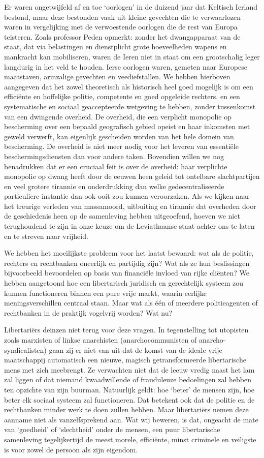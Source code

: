 \documentclass[
  a5paper,
  smalldemyvopaper,10pt,twoside,onecolumn,openright,extrafontsizes,hidelinks]{memoir}
\begin{document}
Er waren ongetwijfeld af en toe `oorlogen' in de duizend jaar dat
Keltisch Ierland bestond, maar deze bestonden vaak uit kleine gevechten
die te verwaarlozen waren in vergelijking met de verwoestende oorlogen
die de rest van Europa teisteren. Zoals professor Peden opmerkt: zonder
het dwangapparaat van de staat, dat via belastingen en dienstplicht
grote hoeveelheden wapens en mankracht kan mobiliseren, waren de Ieren
niet in staat om een grootschalig leger langdurig in het veld te houden.
Ierse oorlogen waren, gemeten naar Europese maatstaven, armzalige
gevechten en veediefstallen. We hebben hierboven aangegeven dat het
zowel theoretisch als historisch heel goed mogelijk is om een efficiënte
en hoffelijke politie, competente en goed opgeleide rechters, en een
systematische en sociaal geaccepteerde wetgeving te hebben, zonder
tussenkomst van een dwingende overheid. De overheid, die een verplicht
monopolie op bescherming over een bepaald geografisch gebied opeist en
haar inkomsten met geweld verwerft, kan eigenlijk gescheiden worden van
het hele domein van bescherming. De overheid is niet meer nodig voor het
leveren van essentiële beschermingsdiensten dan voor andere taken.
Bovendien willen we nog benadrukken dat er een cruciaal feit is over de
overheid: haar verplichte monopolie op dwang heeft door de eeuwen heen
geleid tot ontelbare slachtpartijen en veel grotere tirannie en
onderdrukking dan welke gedecentraliseerde particuliere instantie dan
ook ooit zou kunnen veroorzaken. Als we kijken naar het treurige
verleden van massamoord, uitbuiting en tirannie dat overheden door de
geschiedenis heen op de samenleving hebben uitgeoefend, hoeven we niet
terughoudend te zijn in onze keuze om de Leviathaanse staat achter ons
te laten en te streven naar vrijheid.

We hebben het moeilijkste probleem voor het laatst bewaard: wat als de
politie, rechters en rechtbanken oneerlijk en partijdig zijn? Wat als ze
hun beslissingen bijvoorbeeld bevoordelen op basis van financiële
invloed van rijke cliënten? We hebben aangetoond hoe een libertarisch
juridisch en gerechtelijk systeem zou kunnen functioneren binnen een
pure vrije markt, waarin eerlijke meningsverschillen centraal staan.
Maar wat als één of meerdere politieagenten of rechtbanken in de
praktijk vogelvrij worden? Wat nu?

Libertariërs deinzen niet terug voor deze vragen. In tegenstelling tot
utopisten zoals marxisten of linkse anarchisten (anarchocommunisten of
anarcho-syndicalisten) gaan zij er niet van uit dat de komst van de
ideale vrije maatschappij automatisch een nieuwe, magisch
getransformeerde libertarische mens met zich meebrengt. Ze verwachten
niet dat de leeuw vredig naast het lam zal liggen of dat niemand
kwaadwillende of frauduleuze bedoelingen zal hebben ten opzichte van
zijn buurman. Natuurlijk geldt: hoe `beter' de mensen zijn, hoe beter
elk sociaal systeem zal functioneren. Dat betekent ook dat de politie en
de rechtbanken minder werk te doen zullen hebben. Maar libertariërs
nemen deze aanname niet als vanzelfsprekend aan. Wat wij beweren, is
dat, ongeacht de mate van `goedheid' of `slechtheid' onder de mensen,
een puur libertarische samenleving tegelijkertijd de meest morele,
efficiënte, minst criminele en veiligste is voor zowel de persoon als
zijn eigendom.
\end{document}
